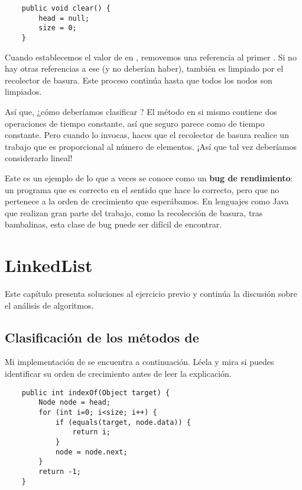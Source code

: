 \documentclass[12pt]{book}
\theoremstyle{exercise}
\begin{document}
\begin{verbatim}
    public void clear() {
        head = null;
        size = 0;
    }
\end{verbatim}

Cuando establecemos el valor de  en , removemos una
referencia al primer . Si no hay otras referencias a ese 
(y no deberían haber), también es limpiado por el recolector de basura. Este
proceso continúa hasta que todos los nodos son limpiados.

Así que, ¿cómo deberíamos clasificar ? El método en si mismo contiene dos
operaciones de tiempo constante, así que seguro parece como de tiempo constante. Pero
cuando lo invocas, haces que el recolector de basura realice un trabajo que es
proporcional al número de elementos. ¡Así que tal vez deberíamos considerarlo lineal!


Este es un ejemplo de lo que a veces se conoce como un {\bf bug de rendimiento}:
un programa que es correcto en el sentido que hace lo correcto,
pero que no pertenece a la orden de crecimiento que esperábamos. En lenguajes
como Java que realizan gran parte del trabajo, como la recolección de basura,
tras bambalinas, esta clase de bug puede ser difícil de encontrar.


\chapter{LinkedList}

Este capítulo presenta soluciones al ejercicio previo y continúa la
discusión sobre el análisis de algoritmos.


\section{Clasificación de los métodos de }
\label{classifying-mylinkedlist-methods}

Mi implementación de  se encuentra a continuación. Léela y mira
si puedes identificar su orden de crecimiento antes de leer la explicación.

\begin{verbatim}
    public int indexOf(Object target) {
        Node node = head;
        for (int i=0; i<size; i++) {
            if (equals(target, node.data)) {
                return i;
            }
            node = node.next;
        }
        return -1;
    }
\end{verbatim}
\end{document}
